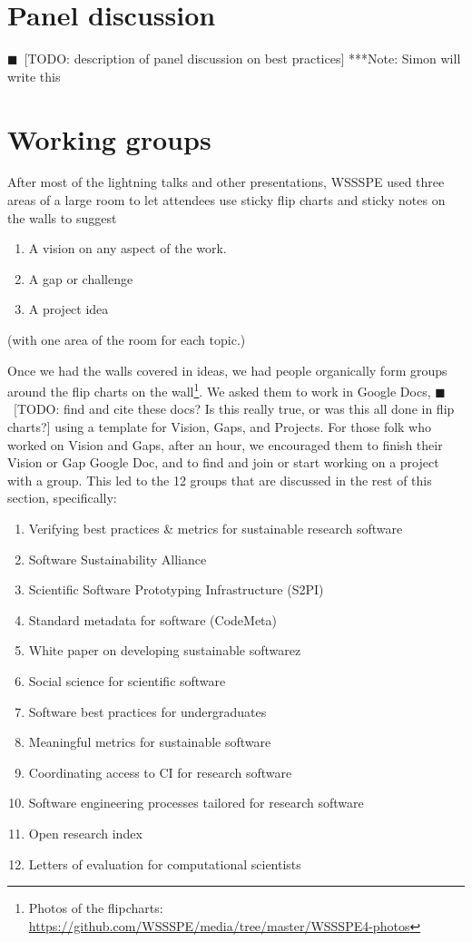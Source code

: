 \documentclass[11pt, oneside]{amsart}
\newcommand{\todo}[1]{{\color{blue}$\blacksquare$~\textsf{[TODO: #1]}}}
\newcommand{\note}[1]{ {\textcolor{blueish}    { ***Note:      #1 }}}
\begin{document}
\section{Panel discussion} \label{sec:panel}

\todo{description of panel discussion on best practices} \note{Simon will write this}

\section{Working groups} \label{sec:WGs}

After most of the lightning talks and other presentations, WSSSPE used three areas of a large room to let
attendees use sticky flip charts and sticky notes on the walls to suggest
\begin{enumerate}
\item A vision on any aspect of the work.
\item A gap or challenge
\item A project idea
\end{enumerate}
(with one area of the room for each topic.)

Once we had the walls covered in ideas, we had people organically form groups around the flip charts on the wall\footnote{Photos of the flipcharts: \url{https://github.com/WSSSPE/media/tree/master/WSSSPE4-photos}}. We asked them to work in Google Docs, \todo{find and cite these docs?  Is this really true, or was this all done in flip charts?} using a template for Vision, Gaps, and Projects.  For those folk who worked on Vision and Gaps, after an hour, we encouraged them to finish their Vision or Gap Google Doc, and to find and join or start working on a project with a group. This led to the 12 groups that are discussed in the rest of this section, specifically:
\begin{enumerate}
\item Verifying best practices \& metrics for sustainable research software
\item Software Sustainability Alliance
\item Scientific Software Prototyping Infrastructure (S2PI)
\item Standard metadata for software (CodeMeta)
\item White paper on developing sustainable softwarez
\item Social science for scientific software
\item Software best practices for undergraduates
\item Meaningful metrics for sustainable software
\item Coordinating access to CI for research software
\item Software engineering processes tailored for research software
\item Open research index
\item Letters of evaluation for computational scientists
\end{enumerate}
\end{document}
